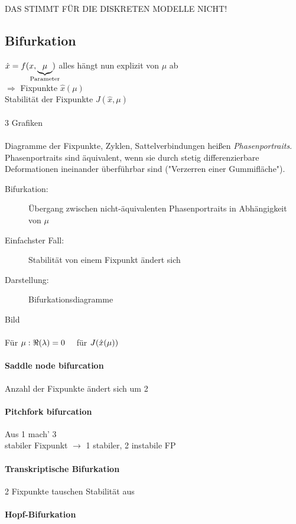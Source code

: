 DAS STIMMT FÜR DIE DISKRETEN MODELLE NICHT!

\subsection{Bifurkation}
$ \dot{x} = f(x, \underbrace{\mu}_{\mathclap{\text{Parameter}}}) $ \qquad 
alles hängt nun explizit von $  \mu $ ab \\
$ \Rightarrow $ Fixpunkte $ \hat{x}(\mu) $ \\
Stabilität der Fixpunkte $ J(\hat{x}, \mu) $ \\\\
3 Grafiken \\\\
Diagramme der Fixpunkte, Zyklen, Sattelverbindungen heißen \emph{Phasenportraits}. \\
Phasenportraits sind äquivalent, wenn sie durch stetig differenzierbare Deformationen ineinander überführbar sind ("Verzerren einer Gummifläche"). 
\begin{description}
    \item[Bifurkation:] Übergang zwischen nicht-äquivalenten Phasenportraits in Abhängigkeit von $\mu$
    \item[Einfachster Fall:] Stabilität von einem Fixpunkt ändert sich
    \item[Darstellung:] Bifurkationsdiagramme
\end{description}

Bild \\\\
Für $ \mu\*: \Re(\lambda) = 0 \quad $ für $ J(\hat{x}(\mu\*)) $
\paragraph{Saddle node bifurcation}
Anzahl der Fixpunkte ändert sich um 2
\paragraph{Pitchfork bifurcation}
Aus 1 mach' 3 \\
stabiler Fixpunkt $\rightarrow$ 1 stabiler, 2 instabile FP
\paragraph{Transkriptische Bifurkation}
2 Fixpunkte tauschen Stabilität aus
\paragraph{Hopf-Bifurkation}
